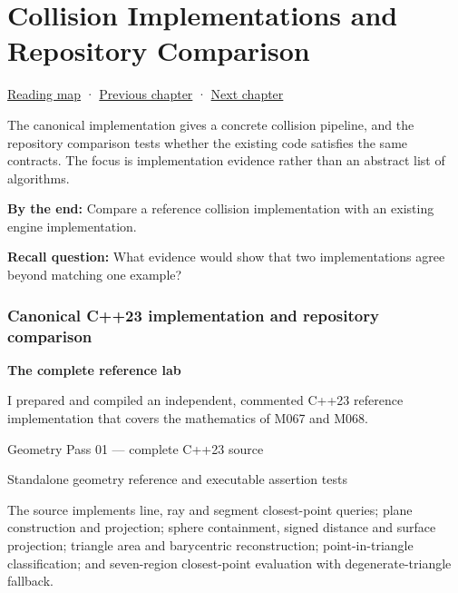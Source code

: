 \chapter{Collision Implementations and Repository Comparison}\label{03-visual-computing-i-ch021-collision-implementations-and-repository-comparison}\hypertarget{03-visual-computing-i-ch021}{}\label{stagechapter:03-visual-computing-i-ch021}

\hypertarget{03-visual-computing-i-ch021-collision-implementations-and-repository-comparison}{}

\hyperref[volume-reading-map]{Reading map} · \hyperref[03-visual-computing-i-ch020-geometry-queries-from-scene-to-contact]{Previous chapter} · \hyperref[04-visual-computing-ii-ch022-convex-support-mapping-and-distance]{Next chapter}

The canonical implementation gives a concrete collision pipeline, and the repository comparison tests whether the existing code satisfies the same contracts. The focus is implementation evidence rather than an abstract list of algorithms.

\textbf{By the end:} Compare a reference collision implementation with an existing engine implementation.

\textbf{Recall question:} What evidence would show that two implementations agree beyond matching one example?

\subsection{Canonical C++23 implementation and repository comparison}\label{03-visual-computing-i-ch021-canonical-c23-implementation-and-repository-comparison}

\hypertarget{03-visual-computing-i-ch021-canonical-c23-implementation-and-repository-comparison}{}

\textbf{The complete reference lab}

I prepared and compiled an independent, commented C++23 reference implementation that covers the mathematics of M067 and M068.

Geometry Pass 01 --- complete C++23 source

Standalone geometry reference and executable assertion tests

The source implements line, ray and segment closest-point queries; plane construction and projection; sphere containment, signed distance and surface projection; triangle area and barycentric reconstruction; point-in-triangle classification; and seven-region closest-point evaluation with degenerate-triangle fallback.

